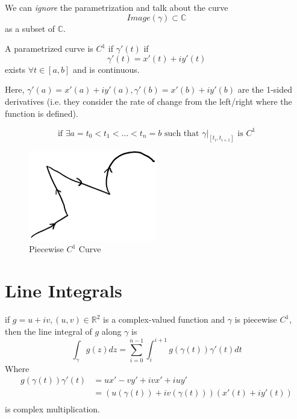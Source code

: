 \begin{remark}
    We can \textit{ignore} the parametrization and talk about the curve $$Image(\gamma) \subset \mathbb{C}$$ as a subset of $\mathbb{C}$.
\end{remark}

\begin{definition}
    A parametrized curve is $C^1$ if $\gamma'(t)$ if
    $$\gamma '(t) = x'(t) + iy'(t)$$ exists $\forall t \in [a,b]$ and is continuous.
\end{definition}

\begin{remark}
    Here, $\gamma'(a) = x'(a) + iy'(a), \gamma'(b) = x'(b) + iy'(b)$ are the 1-sided derivatives (i.e. they consider the rate of change from the left/right where the function is defined).
\end{remark}

\begin{definition}
    $$\text{if } \exists a = t_0 < t_1 < \ldots < t_n = b \text{ such that } \gamma |_{[t_i, t_{i+1}]} \text{ is } C^1$$
\end{definition}
\begin{figure}[H]
    \centering
    \includegraphics[width=0.5\textwidth]{LECTURE_4/piecewise-c1.png}
    \caption{Piecewise $C^1$ Curve}
\end{figure}
\section{Line Integrals}
\begin{definition}
    if $g = u + iv, (u,v) \in \mathbb{R}^2$ is a complex-valued function and $\gamma$ is piecewise $C^1$, then the line integral of $g$ along $\gamma$ is
    $$\int_{\gamma} g(z) dz = \sum_{i=0}^{n-1}\int_{i}^{i+1} g(\gamma(t)) \gamma'(t) dt$$
    Where
    \begin{align*}
        g(\gamma(t)) \gamma'(t) & = ux' - vy' + ivx' + iuy'                        \\
                                & = (u(\gamma(t)) + iv(\gamma(t)))(x'(t) + iy'(t)) \\
    \end{align*}
    is complex multiplication.
\end{definition}

